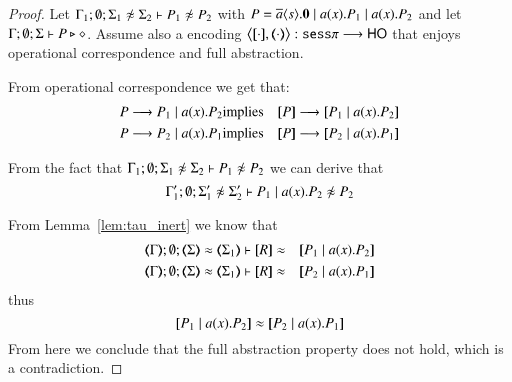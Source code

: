 \begin{proof}
	Let $\Gamma_1; \emptyset; \Sigma_1 \not\wb \Sigma_2 \proves P_1 \not\wb P_2 $
	with $P = \overline{a} \langle s \rangle . \mathbf{0} \;|\; a (x) . P_1 \;|\; a (x) . P_2$ and
	let $\Gamma; \emptyset; \Sigma \vdash P \triangleright \diamond$.
	Assume also a encoding
	$\enc{\cdot}{\cdot}: \sesp \longrightarrow \HO$
	that enjoys
	operational correspondence and full abstraction.

	From operational correspondence we get that:
	\begin{eqnarray*}
		P \red P_1 \Par \bacc{a}{x} P_2 &\textrm{implies}& \map{P} \red \map{P_1 \Par \bacc{a}{x} P_2}\\
		P \red P_2 \Par \bacc{a}{x} P_1 &\textrm{implies}& \map{P} \red \map{P_2 \Par \bacc{a}{x} P_1}
	\end{eqnarray*}

	From the fact that
	$\Gamma_1; \emptyset; \Sigma_1 \not\wb \Sigma_2 \proves P_1 \not\wb P_2$
	we can derive that
	\[
		\Gamma_1'; \emptyset; \Sigma_1' \not\wb \Sigma_2' \proves P_1 \Par \bacc{a}{x} P_2 \not\wb P_2 
	\]

	From Lemma~\ref{lem:tau_inert} we know that
	\begin{eqnarray*}
		\mapt{\Gamma}; \emptyset; \mapt{\Sigma} \wb \mapt{\Sigma_1} \proves \map{R} &\wb& \map{P_1 \Par \bacc{a}{x} P_2}\\
		\mapt{\Gamma}; \emptyset; \mapt{\Sigma} \wb \mapt{\Sigma_1} \proves \map{R} &\wb& \map{P_2 \Par \bacc{a}{x} P_1}
	\end{eqnarray*}
	\noi thus
	\[
		\map{P_1 \Par \bacc{a}{x} P_2} \wb \map{P_2 \Par \bacc{a}{x} P_1}
	\]
	From here we conclude that the full abstraction property does not hold,
	which is a contradiction.
\end{proof}

